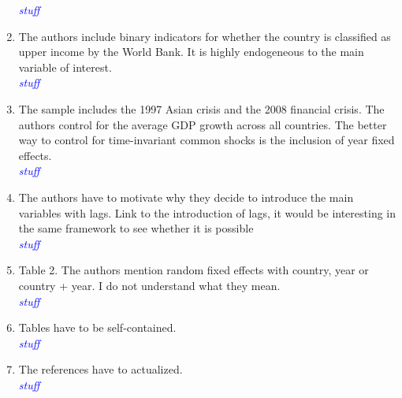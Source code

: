 \begin{enumerate}
\textcolor{blue}{\emph{
	stuff
}}

\item  The authors include binary indicators for whether the country is classified as upper income by the World Bank. It is highly endogeneous to the main variable of interest. \\

\textcolor{blue}{\emph{
	stuff
}}

\item The sample includes the 1997 Asian crisis and the 2008 financial crisis. The authors control for the average GDP growth across all countries. The better way to control for time-invariant common shocks is the inclusion of year fixed effects. \\

\textcolor{blue}{\emph{
	stuff
}}

\item The authors have to motivate why they decide to introduce the main variables with lags. Link to the introduction of lags, it would be interesting in the same framework to see whether it is possible \\

\textcolor{blue}{\emph{
	stuff
}}

\item Table 2. The authors mention random fixed effects with country, year or country + year. I do not understand what they mean. \\

\textcolor{blue}{\emph{
	stuff
}}

\item Tables have to be self-contained. \\

\textcolor{blue}{\emph{
	stuff
}}

\item The references have to actualized. \\

\textcolor{blue}{\emph{
	stuff
}}

\end{enumerate}